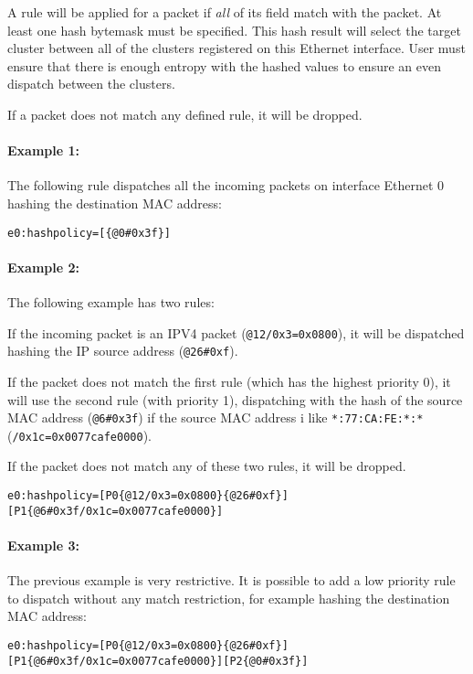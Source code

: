 \documentclass{trkalray}
\begin{document}
A rule will be applied for a packet if \emph{all} of its field match
with the packet. At least one hash bytemask must be specified. This hash
result will select the target cluster between all of the clusters
registered on this Ethernet interface. User must ensure that there is
enough entropy with the hashed values to ensure an even dispatch between
the clusters.

If a packet does not match any defined rule, it will be dropped.

\paragraph{Example 1:}

The following rule dispatches all the incoming packets on interface Ethernet 0
hashing the destination MAC address:
\begin{lstlisting}
e0:hashpolicy=[{@0#0x3f}]
\end{lstlisting}

\paragraph{Example 2:}

The following example has two rules:

If the incoming packet is an IPV4 packet (\texttt{@12/0x3=0x0800}),
 it will be dispatched hashing the IP source address
 (\texttt{@26\#0xf}).

If the packet does not match the first rule
(which has the highest priority 0), it will use the second rule (with
priority 1), dispatching with the hash of the source MAC address
(\texttt{@6\#0x3f}) if the source MAC address i like
\texttt{*:77:CA:FE:*:*} (\texttt{/0x1c=0x0077cafe0000}).

If the packet
does not match any of these two rules, it will be dropped.
\begin{lstlisting}
e0:hashpolicy=[P0{@12/0x3=0x0800}{@26#0xf}][P1{@6#0x3f/0x1c=0x0077cafe0000}]
\end{lstlisting}

\paragraph{Example 3:}

The previous example is very restrictive. It is possible to add a low priority
rule to dispatch without any match restriction, for example hashing the
destination MAC address:
\begin{lstlisting}
e0:hashpolicy=[P0{@12/0x3=0x0800}{@26#0xf}][P1{@6#0x3f/0x1c=0x0077cafe0000}][P2{@0#0x3f}]
\end{lstlisting}
\end{document}
